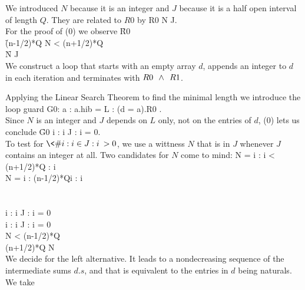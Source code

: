 We introduced $N$ because it is an integer and $J$ because it is
a half open interval of length $Q$. They are related to $R0$ by
 R0 \meq N \in J\qquad.\\

For the proof of (0) we observe
\f R0 \\
\f (n-1/2)*Q \le N < (n+1/2)*Q\\
\f N \in J\\

We construct a loop that starts with an empty array $d$, appends an
integer to $d$ in each iteration and terminates
with $R0 \;\,\land\;\, R1$.

Applying the Linear Search Theorem to find the minimal length
we introduce the loop guard
\nf G0: \< \fa a : a.hib = L : \neg(d \:= a).R0 \>\qquad.\\

Since $N$ is an integer and $J$ depends on $L$ only, not on the entries
of $d$, (0) lets us conclude
\f G0 \mff \<\nbr i : i \in J : i\> = 0\qquad.\\
\filbreak
To test for $\<\nbr i : i \in J : i\> > 0$, we use a wittness $N$
that is in $J$ whenever $J$ contains an integer at all. Two candidates for
$N$ come to mind:
\df N = \< \mx i : i < (n+1/2)*Q : i\>\\  N = \< \mn i : (n-1/2)*Q\le i : i\>\\ 
\df \;\mand\\                               \;\mand \\
\df \<\nbr i : i \in J : i\> = 0\\         \<\nbr i : i \in J : i\> = 0\\
\dh{}                     
\df   N < (n-1/2)*Q                 \\    (n+1/2)*Q \le N        \\
\filbreak
We decide for the left alternative. It leads to a nondecreasing
sequence of the intermediate sums $d.s$, and that is equivalent to
the entries in $d$ being naturals. We take

